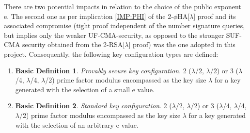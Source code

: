 \documentclass[]{final_report}
\theoremstyle{definition}
\newtheorem{basic}{Basic Definition}
\begin{document}

There are two potential impacts in relation to the choice of the public exponent e. The second one as per implication \ref{IMP:PHI} of the 2-\(\phi\)HA[\(\lambda\)] proof and its associated compromise (tight proof independent of the number signature queries, but implies only the weaker UF-CMA-security, as opposed to the stronger SUF-CMA security obtained from the 2-RSA[\(\lambda\)] proof) was the one adopted in this project. Consequently, the following key configuration types are defined:

\begin{enumerate}
    \item[] \begin{basic}  \label{PROVKEY}
\textit{Provably secure key configuration}. 2 ($\lambda$/2, $\lambda$/2) or 3 ($\lambda$/4, $\lambda$/4, $\lambda$/2) prime factor modulus encompassed as the key size $\lambda$ for a key generated with the selection of a small e value.
\end{basic}
    \item[] \begin{basic}
\textit{Standard key configuration}. 2 ($\lambda$/2, $\lambda$/2) or 3 ($\lambda$/4, $\lambda$/4, $\lambda$/2) prime factor modulus encompassed as the key size $\lambda$ for a key generated with the selection of an arbitrary e value.
\end{basic}

\end{enumerate}
\end{document}
